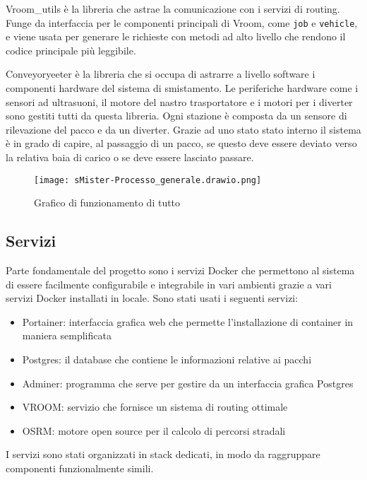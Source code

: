 \documentclass[12pt]{article}
\begin{document}
Vroom\_utils è la libreria che astrae la comunicazione con i servizi di routing. Funge da interfaccia per le componenti principali di Vroom, come \texttt{job} e \texttt{vehicle}, e viene usata per generare le richieste con metodi ad alto livello che rendono il codice principale più leggibile.

Conveyoryeeter è la libreria che si occupa di astrarre a livello software i componenti hardware del sistema di smistamento. Le periferiche hardware come i sensori ad ultrasuoni, il motore del nastro trasportatore e i motori per i diverter sono gestiti tutti da questa libreria. Ogni stazione è composta da un sensore di rilevazione del pacco e da un diverter. Grazie ad uno stato stato interno il sistema è in grado di capire, al passaggio di un pacco, se questo deve essere deviato verso la relativa baia di carico o se deve essere lasciato passare.

\begin{figure}[H]
    \centering
    \texttt{[image: sMister-Processo\_generale.drawio.png]}
    \caption{Grafico di funzionamento di tutto}
    \label{imamagine2}
\end{figure}

\subsection{Servizi}

Parte fondamentale del progetto sono i servizi Docker che permettono al sistema di essere facilmente configurabile e integrabile in vari ambienti grazie a vari servizi Docker installati in locale. Sono stati usati i seguenti servizi:

\begin{itemize}
    \item Portainer: interfaccia grafica web che permette l'installazione di container in maniera semplificata
    \item Postgres: il database che contiene le informazioni relative ai pacchi
    \item Adminer: programma che serve per gestire da un interfaccia grafica Postgres
    \item VROOM: servizio che fornisce un sistema di routing ottimale
    \item OSRM: motore open source per il calcolo di percorsi stradali
\end{itemize}

I servizi sono stati organizzati in stack dedicati, in modo da raggruppare componenti funzionalmente simili.
\end{document}
